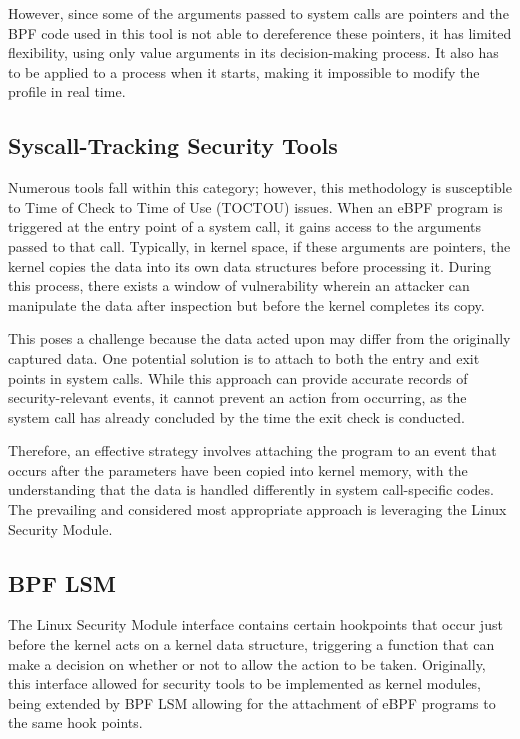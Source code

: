 However, since some of the arguments passed to system calls are pointers and the BPF code used in this tool is not able to dereference these pointers, it has limited flexibility, using only value arguments in its decision-making process. It also has to be applied to a process when it starts, making it impossible to modify the profile in real time. 

\subsection{Syscall-Tracking Security Tools}

Numerous tools fall within this category; however, this methodology is susceptible to Time of Check to Time of Use (TOCTOU) issues. When an eBPF program is triggered at the entry point of a system call, it gains access to the arguments passed to that call. Typically, in kernel space, if these arguments are pointers, the kernel copies the data into its own data structures before processing it. During this process, there exists a window of vulnerability wherein an attacker can manipulate the data after inspection but before the kernel completes its copy.

This poses a challenge because the data acted upon may differ from the originally captured data. One potential solution is to attach to both the entry and exit points in system calls. While this approach can provide accurate records of security-relevant events, it cannot prevent an action from occurring, as the system call has already concluded by the time the exit check is conducted.

Therefore, an effective strategy involves attaching the program to an event that occurs after the parameters have been copied into kernel memory, with the understanding that the data is handled differently in system call-specific codes. The prevailing and considered most appropriate approach is leveraging the Linux Security Module.

\subsection{BPF LSM}

The Linux Security Module interface contains certain hookpoints that occur just before the kernel acts on a kernel data structure, triggering a function that can make a decision on whether or not to allow the action to be taken. Originally, this interface allowed for security tools to be implemented as kernel modules, being extended by BPF LSM allowing for the attachment of eBPF programs to the same hook points. 

